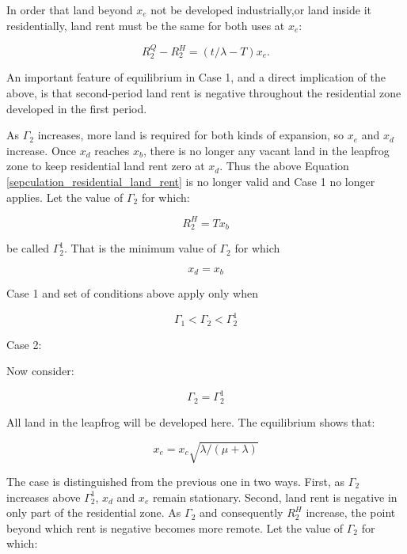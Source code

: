 In order that land beyond $x_e$ not be developed industrially,or land inside it residentially, land rent must be the same for both uses at $x_e$:

\begin{equation}
    R_2^Q - R_2^H = (t / \lambda - T)x_e.
\end{equation}

An important feature of equilibrium in Case 1, and a direct implication of the above, is that second-period land rent is negative throughout the residential zone developed in the first period.

As $\Gamma_2$ increases, more land is required for both kinds of expansion, so $x_e$ and $x_d$ increase. Once $x_d$ reaches $x_b$, there is no longer any vacant land in the leapfrog zone to keep residential land rent zero at $x_d$. Thus the above Equation \eqref{sepculation_residential_land_rent} is no longer valid and Case 1 no longer applies. Let the value of $\Gamma_2$ for which:

\begin{equation*}
    R_2^H = Tx_b
\end{equation*}

be called $\Gamma_2^1$. That is the minimum value of $\Gamma_2$ for which

\begin{equation}
    x_d = x_b
\end{equation}

Case 1 and set of conditions above apply only when

\begin{equation*}
    \Gamma_1 < \Gamma_2 < \Gamma_2^1
\end{equation*}

Case 2:

Now consider:

\begin{equation*}
    \Gamma_2 = \Gamma_2^1
\end{equation*}

All land in the leapfrog will be developed here. The equilibrium shows that:

\begin{equation*}
    x_e = x_c \sqrt{\lambda / (\mu + \lambda)}
\end{equation*}

The case is distinguished from the previous one in two ways. First, as $\Gamma_2$ increases above $\Gamma_2^1$, $x_d$ and $x_e$ remain stationary. Second, land rent is negative in only part of the residential zone. As $\Gamma_2$ and consequently $R_2^H$ increase, the point beyond which rent is negative becomes more remote. Let the value of $\Gamma_2$ for which:


